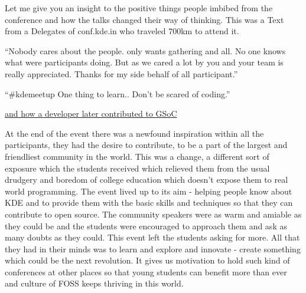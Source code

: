 Let me give you an insight to the positive things people imbibed from the conference and how the talks changed their way of thinking. This was a Text from a Delegates of conf.kde.in  who traveled 700km to attend it.

``Nobody cares about the people. only wants gathering and all. No one knows what were participants doing. But as we cared a lot by you and your team is really appreciated. Thanks for my side behalf of all participant.''

``\#kdemeetup One thing to learn.. Don’t be scared of coding.''
 
\href{https://mail.kde.org/pipermail/kde-india/2014-April/001236.html}{and how a developer later contributed to GSoC}

At the end of the event there was a newfound inspiration within all the participants, they had the desire to contribute, to be a part of the largest and friendliest community in the world. This was a change, a different sort of exposure which the students received which relieved them from the usual drudgery and boredom of college education which doesn’t expose them to real world programming. The event lived up to its aim - helping people know about KDE and to provide them with the basic skills and techniques so that they can contribute to open source. The community speakers were as warm and amiable as they could be and the students were encouraged to approach them and ask as many doubts as they could. This event left the students asking for more. All that they had in their minds was to learn and explore and innovate - create something which could be the next revolution. It gives us motivation to hold such kind of conferences at other places so that young students can benefit more than ever and culture of FOSS keeps thriving in this world.

